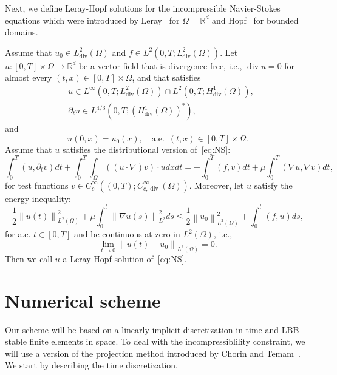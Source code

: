 \documentclass[10pt,letterpaper]{amsart}
\newcommand{\R}{\mathbb{R}}
\newcommand\norm[1]{\left\lVert#1\right\rVert}
\newcommand{\Grad}{\nabla}
\newcommand{\Div}{\operatorname{div}}
\newcommand{\dom}{\Omega}
\theoremstyle{definition}{\newtheorem{definition}[lemma]{Definition}}
\numberwithin{equation}{section}
\begin{document}
Next, we define  Leray-Hopf solutions for the incompressible Navier-Stokes equations which were introduced by Leray~\cite{Leray1934} for $\dom=\R^d$ and Hopf~\cite{Hopf1951} for bounded domains. 
\begin{definition}
	\label{def:weaksol}
Assume that $u_0\in L^2_{\Div}(\dom)$ and $f\in L^2(0,T;L^2_{\Div}(\dom))$.
	Let $u:[0,T]\times\dom\to \R^d$ be a vector field that is divergence-free, i.e., $\Div u=0$ for almost every $(t,x)\in [0,T]\times\dom$, and that satisfies
	\begin{equation}
	\label{eq:regularity}
\begin{split}
	&u\in L^\infty(0,T;L^2_{\Div}(\dom))\cap L^2(0,T;H^1_{\Div}(\dom)), \\
	&\partial_t u \in L^{4/3}(0,T;(H^1_{\Div}(\dom))^*), 
\end{split}
	\end{equation}
	and 
	\begin{equation}
	\label{eq:initdata}
	u(0,x) = u_0(x),\quad \text{a.e. }\, (t,x)\in [0,T]\times\dom.
	\end{equation}
Assume that $u$ satisfies 
 the distributional version of~\eqref{eq:NS}:
		\begin{equation}
		\label{eq:weakformu}
 \int_0^T  ({u},\partial_t v) dt +\int_0^T\int_\dom ((u\cdot\Grad )v) \cdot u dxdt
		=-\int_0^T (f,v) dt+\mu\int_0^T  (\Grad u,\Grad v )dt,
		\end{equation}	
%
for test functions $v\in C_c^\infty((0,T);C^\infty_{c,\Div}(\dom))$.
Moreover, let $u$ satisfy the energy inequality:
\begin{equation}
\label{eq:energyineq}
\frac12\norm{u(t)}_{L^2(\dom)}^2  +\mu\int_0^t\norm{\Grad u(s)}_{L^2}^2 ds
\leq \frac12\norm{u_0}_{L^2(\dom)}^2 + \int_0^t (f,u) ds,
\end{equation}
for a.e. $t\in [0,T]$ and be continuous at zero in $L^2(\dom)$, i.e.,
\begin{equation*}
	\lim_{t\to 0} \norm{u(t)-u_0}_{L^2(\dom)} = 0.
\end{equation*}
Then we call $u$ a Leray-Hopf solution of~\eqref{eq:NS}.
\end{definition}


\section{Numerical scheme}\label{sec:num}
Our scheme will be based on a linearly implicit discretization in time and LBB stable finite elements in space. To deal with the incompressiblility constraint, we will use a version of the projection method introduced by Chorin and Temam~\cite{Chorin1967,Chorin1968,Temam1969,Temam1977}. We start by describing the time discretization.
\end{document}
